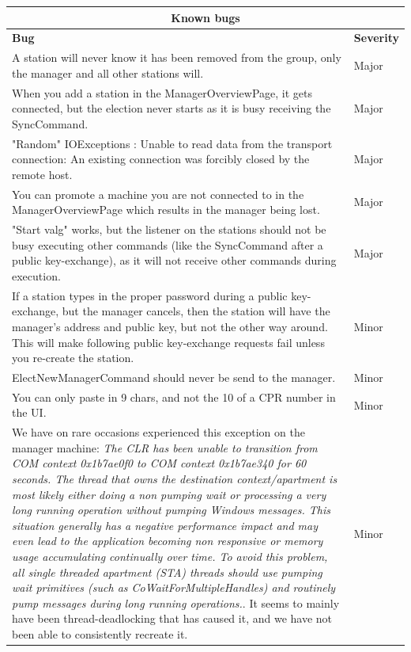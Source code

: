 \documentclass[a4paper]{report}
\begin{document}
\noindent \begin{longtable}{|p{\textwidth-20mm}|p{15mm}|}
\multicolumn{2}{c}{Known bugs}

\\\hline
\bf Bug & \bf Severity

\\\hline
A station will never know it has been removed from the group, only the manager and all other stations will. & Major

\\\hline
When you add a station in the ManagerOverviewPage, it gets connected, but the election never starts as it is busy receiving the SyncCommand. & Major

\\\hline
"Random" IOExceptions : Unable to read data from the transport connection: An existing connection was forcibly closed by the remote host. & Major

\\\hline
You can promote a machine you are not connected to in the ManagerOverviewPage which results in the manager being lost. & Major

\\\hline
"Start valg" works, but the listener on the stations should not be busy executing other commands (like the SyncCommand after a public key-exchange), as it will not receive other commands during execution. & Major

\\\hline
If a station types in the proper password during a public key-exchange, but the manager cancels, then the station will have the manager's address and public key, but not the other way around. This will make following public key-exchange requests fail unless you re-create the station. & Minor

\\\hline
ElectNewManagerCommand should never be send to the manager. & Minor

\\\hline
You can only paste in 9 chars, and not the 10 of a CPR number in the UI. & Minor

\\\hline
We have on rare occasions experienced this exception on the manager machine: \emph{The CLR has been unable to transition from COM context 0x1b7ae0f0 to COM context 0x1b7ae340 for 60 seconds. The thread that owns the destination context/apartment is most likely either doing a non pumping wait or processing a very long running operation without pumping Windows messages. This situation generally has a negative performance impact and may even lead to the application becoming non responsive or memory usage accumulating continually over time. To avoid this problem, all single threaded apartment (STA) threads should use pumping wait primitives (such as CoWaitForMultipleHandles) and routinely pump messages during long running operations.}. 
It seems to mainly have been thread-deadlocking that has caused it, and we have not been able to consistently recreate it.
& Minor


\end{longtable}
\end{document}
